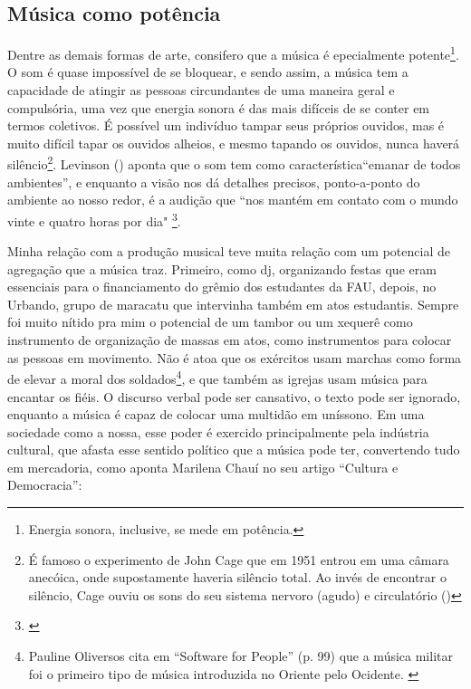 \subsection{Música como potência}
Dentre as demais formas de arte, consifero que a música é epecialmente potente\footnote{Energia sonora, inclusive, se mede em potência.}. O som é quase impossível de se bloquear, e sendo assim, a música tem a capacidade de atingir as pessoas circundantes de uma maneira geral e compulsória, uma vez que energia sonora é das mais difíceis de se conter em termos coletivos. É possível um indivíduo tampar seus próprios ouvidos, mas é muito difícil tapar os ouvidos alheios, e mesmo tapando os ouvidos, nunca haverá silêncio\footnote{É famoso o experimento de John Cage que em 1951 entrou em uma câmara anecóica, onde supostamente haveria silêncio total. Ao invés de encontrar o silêncio, Cage ouviu os sons do seu sistema nervoro (agudo) e circulatório (\cite{Mauceri1997})}. Levinson (\citeyear{Levinson2001}) aponta que o som tem como característica``emanar de todos ambientes'', e enquanto a visão nos dá detalhes precisos, ponto-a-ponto do ambiente ao nosso redor, é a audição que ``nos mantém em contato com o mundo vinte e quatro horas por dia" \footnote{\cite[p. 47]{Levinson2001}}.  


 

Minha relação com a produção musical teve muita relação com um potencial de agregação que a música traz. Primeiro, como dj, organizando festas que eram essenciais para o financiamento do grêmio dos estudantes da FAU, depois, no Urbando, grupo de maracatu que intervinha também em atos estudantis. Sempre foi muito nítido pra mim o potencial de um tambor ou um xequerê como instrumento de organização de massas em atos, como instrumentos para colocar as pessoas em movimento. Não é atoa que os exércitos usam marchas como forma de elevar a moral dos soldados\footnote{Pauline Oliversos cita em ``Software for People'' (p. 99) que a música militar foi o primeiro tipo de música introduzida no Oriente pelo Ocidente. \cite{Oliveros2012}}, e que também as igrejas usam música para encantar os fiéis. O discurso verbal pode ser cansativo, o texto pode ser ignorado, enquanto a música é capaz de colocar uma multidão em uníssono. Em uma sociedade como a nossa, esse poder é exercido principalmente pela indústria cultural, que afasta esse sentido político que a música pode ter, convertendo tudo em mercadoria, como aponta Marilena Chauí no seu artigo ``Cultura e Democracia'': 

